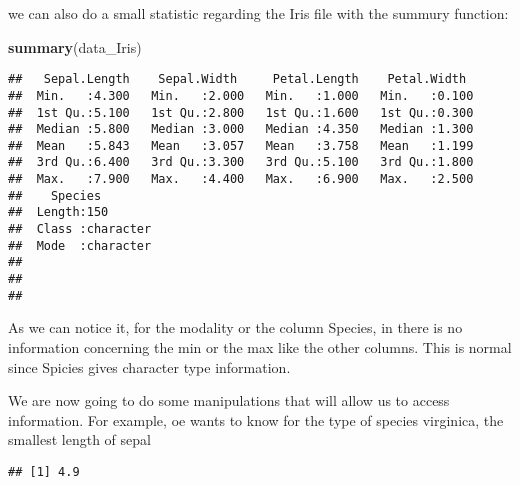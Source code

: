 \documentclass[
]{article}
\newenvironment{Shaded}{\begin{snugshade}}{\end{snugshade}}
\newcommand{\DecValTok}[1]{\textcolor[rgb]{0.00,0.00,0.81}{#1}}
\newcommand{\FunctionTok}[1]{\textcolor[rgb]{0.13,0.29,0.53}{\textbf{#1}}}
\newcommand{\NormalTok}[1]{#1}
\newcommand{\SpecialCharTok}[1]{\textcolor[rgb]{0.81,0.36,0.00}{\textbf{#1}}}
\newcommand{\StringTok}[1]{\textcolor[rgb]{0.31,0.60,0.02}{#1}}
\begin{document}
we can also do a small statistic regarding the Iris file with the
summury function:

\begin{Shaded}
\begin{Highlighting}[]
\FunctionTok{summary}\NormalTok{(data\_Iris)}
\end{Highlighting}
\end{Shaded}

\begin{verbatim}
##   Sepal.Length    Sepal.Width     Petal.Length    Petal.Width   
##  Min.   :4.300   Min.   :2.000   Min.   :1.000   Min.   :0.100  
##  1st Qu.:5.100   1st Qu.:2.800   1st Qu.:1.600   1st Qu.:0.300  
##  Median :5.800   Median :3.000   Median :4.350   Median :1.300  
##  Mean   :5.843   Mean   :3.057   Mean   :3.758   Mean   :1.199  
##  3rd Qu.:6.400   3rd Qu.:3.300   3rd Qu.:5.100   3rd Qu.:1.800  
##  Max.   :7.900   Max.   :4.400   Max.   :6.900   Max.   :2.500  
##    Species         
##  Length:150        
##  Class :character  
##  Mode  :character  
##                    
##                    
## 
\end{verbatim}

As we can notice it, for the modality or the column Species, in there is
no information concerning the min or the max like the other columns.
This is normal since Spicies gives character type information.

We are now going to do some manipulations that will allow us to access
information. For example, oe wants to know for the type of species
virginica, the smallest length of sepal

\begin{Shaded}
\end{Shaded}

\begin{verbatim}
## [1] 4.9
\end{verbatim}

\begin{Shaded}
\end{Shaded}
\end{document}
